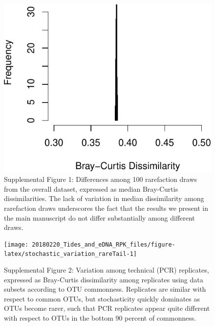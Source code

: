 \documentclass[fleqn,10pt]{wlpeerj}
\begin{document}
\begin{figure}[!ht]

{\centering \includegraphics{figures/Supplement_Rarefaction_data-1} 

}

\caption*{\label{fig:SuppFig1} Supplemental Figure 1: Differences among 100 rarefaction draws from the overall dataset, expressed as median Bray-Curtis dissimilarities. The lack of variation in median dissimilarity among rarefaction draws underscores the fact that the results we present in the main manuscript do not differ substantially among different draws.}\label{fig:Supplement_Rarefaction_data}
\end{figure}

\begin{figure}[!ht]

{\centering \texttt{[image: 20180220\_Tides\_and\_eDNA\_RPK\_files/figure-latex/stochastic\_variation\_rareTail-1]} 

}

\caption*{\label{fig:SuppFig2}Supplemental Figure 2: Variation among technical (PCR) replicates, expressed as Bray-Curtis dissimilarity among replicates using data subsets according to OTU commonness. Replicates are similar with respect to common OTUs, but stochasticity quickly dominates as OTUs become rarer, such that PCR replicates appear quite different with respect to OTUs in the bottom 90 percent of commonness.}\label{fig:stochastic_variation_rareTail}
\end{figure}
\end{document}
